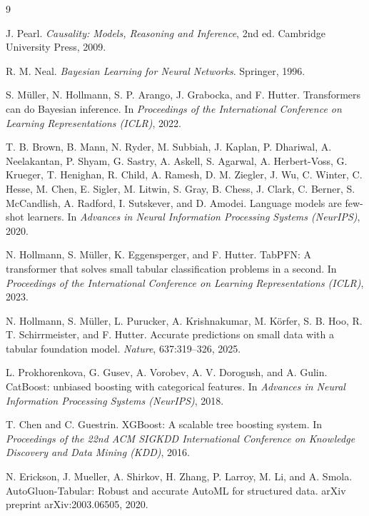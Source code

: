 \documentclass[12pt]{article}
\begin{document}
\begin{thebibliography}{9}

J. Pearl.
\textit{Causality: Models, Reasoning and Inference}, 2nd ed.
Cambridge University Press, 2009.

R. M. Neal.
\textit{Bayesian Learning for Neural Networks}.
Springer, 1996.

S. Müller, N. Hollmann, S. P. Arango, J. Grabocka, and F. Hutter.
Transformers can do Bayesian inference.
In \textit{Proceedings of the International Conference on Learning Representations (ICLR)}, 2022.

T. B. Brown, B. Mann, N. Ryder, M. Subbiah, J. Kaplan, P. Dhariwal, A. Neelakantan, P. Shyam, G. Sastry, A. Askell, S. Agarwal, A. Herbert-Voss, G. Krueger, T. Henighan, R. Child, A. Ramesh, D. M. Ziegler, J. Wu, C. Winter, C. Hesse, M. Chen, E. Sigler, M. Litwin, S. Gray, B. Chess, J. Clark, C. Berner, S. McCandlish, A. Radford, I. Sutskever, and D. Amodei.
Language models are few-shot learners.
In \textit{Advances in Neural Information Processing Systems (NeurIPS)}, 2020.

N. Hollmann, S. Müller, K. Eggensperger, and F. Hutter.
TabPFN: A transformer that solves small tabular classification problems in a second.
In \textit{Proceedings of the International Conference on Learning Representations (ICLR)}, 2023.

N. Hollmann, S. Müller, L. Purucker, A. Krishnakumar, M. Körfer, S. B. Hoo, R. T. Schirrmeister, and F. Hutter.
Accurate predictions on small data with a tabular foundation model.
\textit{Nature}, 637:319--326, 2025.

L. Prokhorenkova, G. Gusev, A. Vorobev, A. V. Dorogush, and A. Gulin.
CatBoost: unbiased boosting with categorical features.
In \textit{Advances in Neural Information Processing Systems (NeurIPS)}, 2018.

T. Chen and C. Guestrin.
XGBoost: A scalable tree boosting system.
In \textit{Proceedings of the 22nd ACM SIGKDD International Conference on Knowledge Discovery and Data Mining (KDD)}, 2016.

N. Erickson, J. Mueller, A. Shirkov, H. Zhang, P. Larroy, M. Li, and A. Smola.
AutoGluon-Tabular: Robust and accurate AutoML for structured data.
arXiv preprint arXiv:2003.06505, 2020.

\end{thebibliography}
\end{document}
